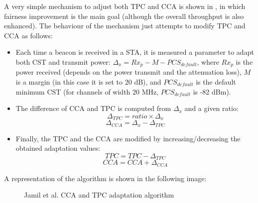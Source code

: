 \documentclass[12pt, a4paper,twoside]{tesi_upf}
\begin{document}
			A very simple mechanism to adjust both TPC and CCA is shown in \cite{jamil2015preserving}, in which fairness improvement is the main goal (although the overall throughput is also enhanced). The behaviour of the mechanism just attempts to modify TPC and CCA as follows:
			\begin{itemize}
				\item Each time a beacon is received in a STA, it is measured a parameter to adapt both CST and transmit power: $\Delta_x = Rx_p - M - PCS_{default}$, where $Rx_p$ is the power received (depends on the power transmit and the attenuation loss), $M$ is a margin (in this case it is set to 20 dB), and $PCS_{default}$ is the default minimum CST (for channels of width 20 MHz, $PCS_{default}$ is -82 dBm).
				\item The difference of CCA and TPC is computed from $\Delta_x$ and a given ratio:
				$$\Delta_{TPC} = ratio \times \Delta_x$$
				$$\Delta_{CCA} = \Delta_x - \Delta_{TPC}$$
				\item Finally, the TPC and the CCA are modified by increasing/decreasing the obtained adaptation values:
				$$TPC = TPC - \Delta_{TPC}$$
				$$CCA = CCA + \Delta_{CCA}$$
			\end{itemize}	
			A representation of the algorithm is shown in the following image:	
			\begin{figure}[h!]
				\centering
				\caption{Jamil et al. CCA and TPC adaptation algorithm}
				\label{fig:jamil_et_at_algorithm}
			\end{figure}
			
\end{document}
